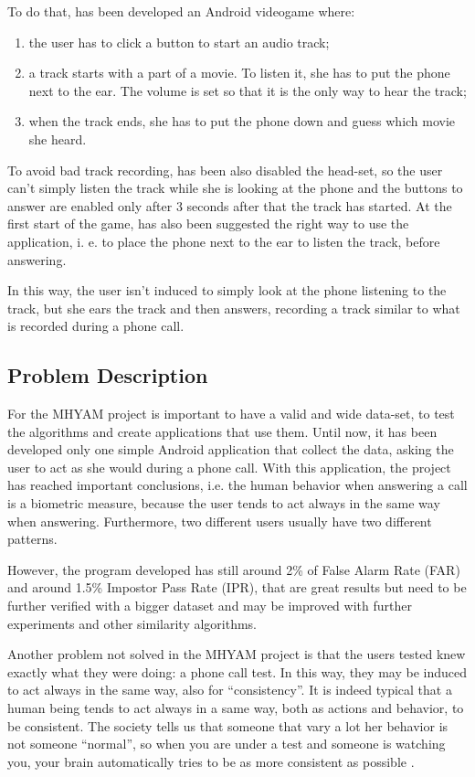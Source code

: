 To do that, has been developed an Android videogame where:
\begin{enumerate}
\item the user has to click a button to start an audio track;
\item a track starts with a part of a movie. To listen it, she has to put the phone next to the ear. The volume is set so that it is the only way to hear the track;
\item when the track ends, she has to put the phone down and guess which movie she heard.
\end{enumerate}

To avoid bad track recording, has been also disabled the head-set, so the user can't simply listen the track while she is looking at the phone and the buttons to answer are enabled only after 3 seconds after that the track has started. At the first start of the game, has also been suggested the right way to use the application, i. e. to place the phone next to the ear to listen the track, before answering.

In this way, the user isn't induced to simply look at the phone listening to the track, but she ears the track and then answers, recording a track similar to what is recorded during a phone call.

\subsection{Problem Description}
\label{sec:problems}
For the MHYAM project \cite{MHYAM} is important to have a valid and wide data-set, to test the algorithms and create applications that use them. Until now, it has been developed only one simple Android application that collect the data, asking the user to act as she would during a phone call. With this application, the project has reached important conclusions, i.e. the human behavior when answering a call is a biometric measure, because the user tends to act always in the same way when answering. Furthermore, two different users usually have two different patterns.

However, the program developed has still around 2\% of False Alarm Rate (FAR) and around 1.5\% Impostor Pass Rate (IPR), that are great results but need to be further verified with a bigger dataset and may be improved with further experiments and other similarity algorithms.

Another problem not solved in the MHYAM project is that the users tested knew exactly what they were doing: a phone call test. In this way, they may be induced to act always in the same way, also for ``consistency''. It is indeed typical that a human being tends to act always in a same way, both as actions and behavior, to be consistent. The society tells us that someone that vary a lot her behavior is not someone ``normal'', so when you are under a test and someone is watching you, your brain automatically tries to be as more consistent as possible \cite{influence}. 

